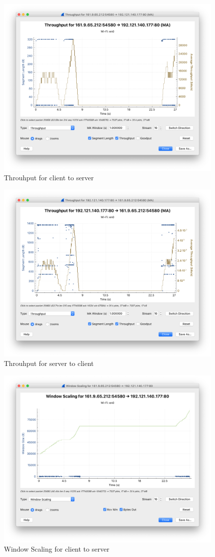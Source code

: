 \documentclass[11pt]{article}
\begin{document}
	\begin{figure}[H]
		\centering
		\includegraphics[width=0.7\linewidth]{throughput1}
		\caption{Throuhput for client to server}
	\end{figure}
	
	
	\begin{figure}[H]
		\centering
		\includegraphics[width=0.7\linewidth]{throughput2}
		\caption{Throuhput for server to client}
	\end{figure}

	\begin{figure}[H]
		\centering
		\includegraphics[width=0.7\linewidth]{window_scale1}
		\caption{Window Scaling for client to server}
	\end{figure}
	
\end{document}
